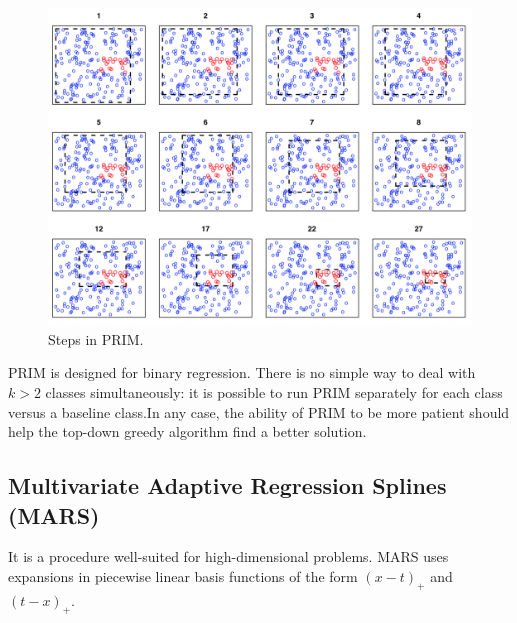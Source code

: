 \documentclass[12pt, letterpaper]{article}
\theoremstyle{definition}
\begin{document}
\begin{figure}
\includegraphics[scale=0.4]{img/PRIM}
\caption{Steps in PRIM.}

\end{figure}
PRIM is designed for binary regression. There is no simple way to deal with $k>2$ classes simultaneously: it is possible to run PRIM separately for each class versus a baseline class.In any case, the ability of PRIM to be more patient should help the top-down greedy algorithm find a better solution.

\subsection{Multivariate Adaptive Regression Splines (MARS)}
It is a procedure well-suited for high-dimensional problems. MARS uses expansions in piecewise linear basis functions of the form $(x-t)_+$ and $(t-x)_+$.
\end{document}
